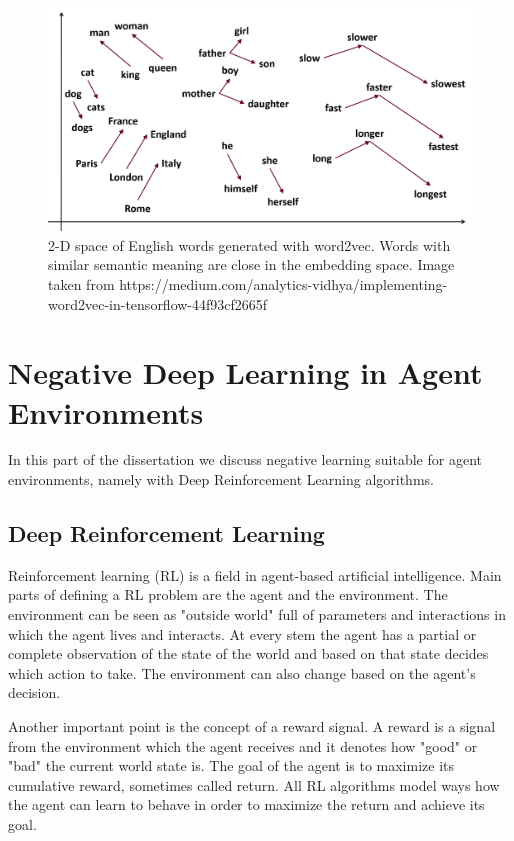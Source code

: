 \documentclass[b5paper]{book}
\begin{document}
\begin{figure}
    \centering
    \includegraphics[scale=0.2]{figures/word2vec.png}    \caption{2-D space of English words generated with word2vec. Words with similar semantic meaning are close in the embedding space. Image taken from https://medium.com/analytics-vidhya/implementing-word2vec-in-tensorflow-44f93cf2665f}
    \label{fig:word2vec}
\end{figure}



\part{Negative Deep Learning in Agent Environments}

In this part of the dissertation we discuss negative learning suitable for agent environments, namely with Deep Reinforcement Learning algorithms.

\chapter{Deep Reinforcement Learning}

Reinforcement learning (RL) is a field in agent-based artificial intelligence. Main parts of defining a RL problem are the agent and the environment. The environment can be seen as "outside world" full of parameters and interactions in which the agent lives and interacts. At every stem the agent has a partial or complete observation of the state of the world and based on that state decides which action to take. The environment can also change based on the agent's decision.

Another important point is the concept of a reward signal. A reward is a signal from the environment which the agent receives and it denotes how "good" or "bad" the current world state is. The goal of the agent is to maximize its cumulative reward, sometimes called return. All RL algorithms model ways how the agent can learn to behave in order to maximize the return and achieve its goal.
\end{document}
